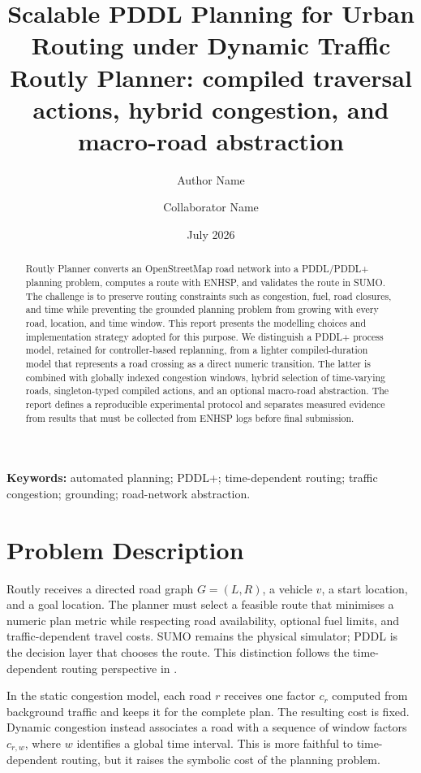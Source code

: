 \documentclass[10pt]{article}
\title{\textbf{Scalable PDDL Planning for Urban Routing under Dynamic Traffic}\\
\large Routly Planner: compiled traversal actions, hybrid congestion, and macro-road abstraction}
\author{Author Name \and Collaborator Name}
\date{July 2026}
\begin{document}
\maketitle

\begin{abstract}
Routly Planner converts an OpenStreetMap road network into a PDDL/PDDL+
planning problem, computes a route with ENHSP, and validates the route in SUMO.
The challenge is to preserve routing constraints such as congestion, fuel, road
closures, and time while preventing the grounded planning problem from growing
with every road, location, and time window. This report presents the modelling
choices and implementation strategy adopted for this purpose. We distinguish a
PDDL+ process model, retained for controller-based replanning, from a lighter
compiled-duration model that represents a road crossing as a direct numeric
transition. The latter is combined with globally indexed congestion windows,
hybrid selection of time-varying roads, singleton-typed compiled actions, and
an optional macro-road abstraction. The report defines a reproducible
experimental protocol and separates measured evidence from results that must be
collected from ENHSP logs before final submission.
\end{abstract}

\noindent\textbf{Keywords:} automated planning; PDDL+; time-dependent routing;
traffic congestion; grounding; road-network abstraction.

\section{Problem Description}
Routly receives a directed road graph $G=(L,R)$, a vehicle $v$, a start location,
and a goal location. The planner must select a feasible route that minimises a
numeric plan metric while respecting road availability, optional fuel limits,
and traffic-dependent travel costs. SUMO remains the physical simulator; PDDL
is the decision layer that chooses the route. This distinction follows the
time-dependent routing perspective in \cite{baum2015}.

In the static congestion model, each road $r$ receives one factor $c_r$ computed
from background traffic and keeps it for the complete plan. The resulting cost
is fixed. Dynamic congestion instead associates a road with a sequence of
window factors $c_{r,w}$, where $w$ identifies a global time interval. This is
more faithful to time-dependent routing, but it raises the symbolic cost of the
planning problem.
\end{document}
